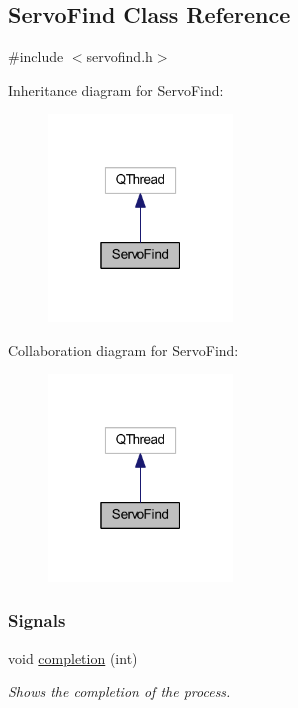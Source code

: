 \hypertarget{a00008}{}\subsection{Servo\+Find Class Reference}
\label{a00008}


{\ttfamily \#include $<$servofind.\+h$>$}



Inheritance diagram for Servo\+Find\+:\nopagebreak
\begin{figure}[H]
\begin{center}
\leavevmode
\includegraphics[width=139pt]{db/d3a/a00040}
\end{center}
\end{figure}


Collaboration diagram for Servo\+Find\+:\nopagebreak
\begin{figure}[H]
\begin{center}
\leavevmode
\includegraphics[width=139pt]{dd/d32/a00041}
\end{center}
\end{figure}
\subsubsection*{Signals}
\begin{DoxyCompactItemize}
\item 
void \hyperlink{a00008_a8ae9f951508e8376c3c7421df37ea619}{completion} (int)
\begin{DoxyCompactList}\small\item\em Shows the completion of the process. \end{DoxyCompactList}\end{DoxyCompactItemize}

